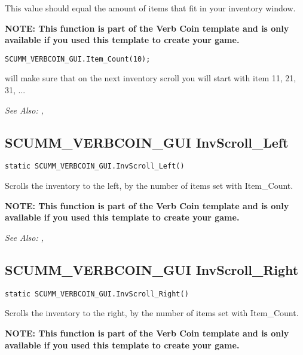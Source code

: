 This value should equal the amount of items that fit in your inventory window.

\bf{NOTE:} This function is part of the Verb Coin template and is only available if
you used this template to create your game.

\begin{verbatim}
SCUMM_VERBCOIN_GUI.Item_Count(10);
\end{verbatim}

will make sure that on the next inventory scroll you will start with item 11, 21, 31, ...

\it{See Also:} ,


\subsection{SCUMM_VERBCOIN_GUI InvScroll_Left}\label{SCUMM_VERBCOIN_GUI.InvScroll_Left}%

\begin{verbatim}
static SCUMM_VERBCOIN_GUI.InvScroll_Left()
\end{verbatim}
Scrolls the inventory to the left, by the number of items set with Item_Count.

\bf{NOTE:} This function is part of the Verb Coin template and is only available if
you used this template to create your game.


\it{See Also:} ,


\subsection{SCUMM_VERBCOIN_GUI InvScroll_Right}\label{SCUMM_VERBCOIN_GUI.InvScroll_Right}%

\begin{verbatim}
static SCUMM_VERBCOIN_GUI.InvScroll_Right()
\end{verbatim}
Scrolls the inventory to the right, by the number of items set with Item_Count.

\bf{NOTE:} This function is part of the Verb Coin template and is only available if
you used this template to create your game.


